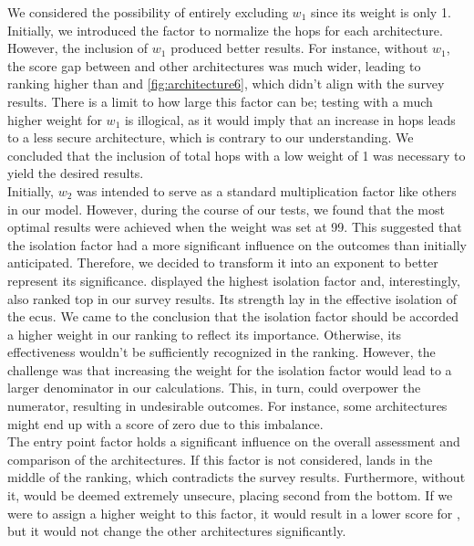 We considered the possibility of entirely excluding $w_{1}$ since its weight is only 1. 
Initially, we introduced the factor to normalize the hops for each architecture. 
However, the inclusion of $w_{1}$ produced better results. 
For instance, without $w_{1}$, the score gap between  and other architectures was much wider, 
leading to  ranking higher than  and \ref{fig:architecture6}, 
which didn't align with the survey results. 
There is a limit to how large this factor can be; testing with a much higher weight for $w_{1}$ is illogical, 
as it would imply that an increase in hops leads to a less secure architecture, which is contrary to our understanding. 
We concluded that the inclusion of total hops with a low weight of 1 was necessary to yield the desired results.\\

Initially, $w_{2}$ was intended to serve as a standard multiplication factor like others in our model. 
However, during the course of our tests, we found that the most optimal results were achieved when the weight was set at 99. 
This suggested that the isolation factor had a more significant influence on the outcomes than initially anticipated. 
Therefore, we decided to transform it into an exponent to better represent its significance.
 displayed the highest isolation factor and, interestingly, also ranked top in our survey results. 
Its strength lay in the effective isolation of the \acrshort{ecu}s. 
We came to the conclusion that the isolation factor should be accorded a higher weight in our ranking to reflect its importance. 
Otherwise, its effectiveness wouldn't be sufficiently recognized in the ranking.
However, the challenge was that increasing the weight for the isolation factor would lead to a larger denominator in our calculations. 
This, in turn, could overpower the numerator, resulting in undesirable outcomes. 
For instance, some architectures might end up with a score of zero due to this imbalance.\\

The entry point factor holds a significant influence on the overall assessment and comparison of the architectures. 
If this factor is not considered,  lands in the middle of the ranking, 
which contradicts the survey results. Furthermore, without it, 
would be deemed extremely unsecure, placing second from the bottom. 
If we were to assign a higher weight to this factor, it would result in a lower score for , 
but it would not change the other architectures significantly.\\

